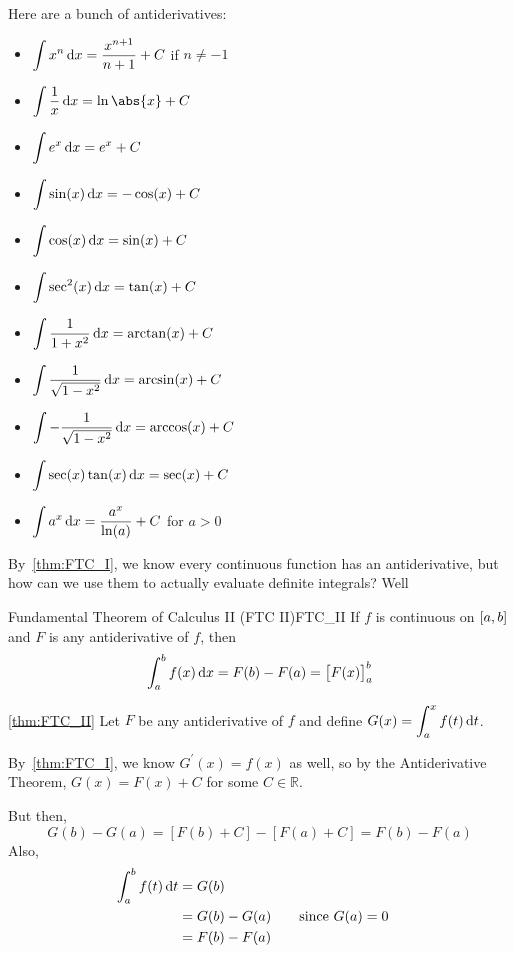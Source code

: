 Here are a bunch of antiderivatives:
\begin{itemize}
    \item $ \displaystyle \int x^n\odif{x}=\frac{x^{n+1}}{n+1}+C $ if $ n\neq -1 $
    \item $ \displaystyle \int \frac{1}{x}\odif{x}=\ln\abs{x}+C $
    \item $ \displaystyle \int e^x\odif{x}=e^x+C $
    \item $ \displaystyle \int \sin(x)\odif{x}=-\cos(x)+C $
    \item $ \displaystyle \int \cos(x)\odif{x}=\sin(x)+C $
    \item $ \displaystyle \int \sec^2(x)\odif{x}=\tan(x)+C $
    \item $ \displaystyle \int \frac{1}{1+x^2}\odif{x}=\arctan(x)+C $
    \item $ \displaystyle \int \frac{1}{\sqrt{1-x^2}}\odif{x}=\arcsin(x)+C $
    \item $ \displaystyle \int -\frac{1}{\sqrt{1-x^2}}\odif{x}=\arccos(x)+C $
    \item $ \displaystyle \int \sec(x)\tan(x)\odif{x}=\sec(x)+C $
    \item $ \displaystyle \int a^x\odif{x}=\frac{a^x}{\ln(a)}+C $ for $ a>0 $
\end{itemize}

By~\ref{thm:FTC_I}, we know every continuous function has an antiderivative,
but how can we use them to actually evaluate definite integrals?
Well\textellipsis{}

\begin{Theorem}{Fundamental Theorem of Calculus II (FTC II)}{FTC_II}
    If $ f $ is continuous on $ \interval{a}{b} $ and $ F $
    is any antiderivative of $ f $, then
    \[ \int_{a}^{b} f(x)\odif{x} =F(b)-F(a)
        =\bigl[F(x)\bigr]_{a}^b \]
\end{Theorem}

\begin{Proof}{\ref{thm:FTC_II}}{}
    Let $ F $ be any antiderivative of $ f $ and define
    $ \displaystyle G(x)=\int_{a}^{x} f(t)\odif{t} $.

    By~\ref{thm:FTC_I}, we know $ G^\prime(x)=f(x) $ as well, so by the
    Antiderivative Theorem, $ G(x)=F(x)+C $ for some $ C\in\mathbb{R} $.

    But then,
    \[ G(b)-G(a)=[F(b)+C]-[F(a)+C]=F(b)-F(a) \]
    Also,
    \begin{align*}
        \int_{a}^{b} f(t)\odif{t}
         & =G(b)                                    \\
         & =G(b)-G(a) & \quad & \text{since }G(a)=0 \\
         & =F(b)-F(a)
    \end{align*}
\end{Proof}

